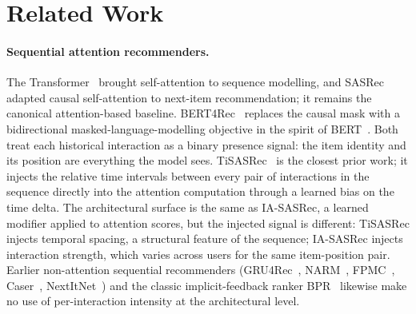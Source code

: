 %
%
\section{Related Work}
\label{sec:related}

\paragraph{Sequential attention recommenders.}
The Transformer~\citep{vaswani2017attention} brought self-attention to
sequence modelling, and SASRec~\citep{kang2018sasrec} adapted causal
self-attention to next-item recommendation; it remains the canonical
attention-based baseline. BERT4Rec~\citep{sun2019bert4rec} replaces the
causal mask with a bidirectional masked-language-modelling objective
in the spirit of BERT~\citep{devlin2019bert}. Both treat each
historical interaction as a binary presence signal: the item identity
and its position are everything the model sees.
TiSASRec~\citep{li2020tisasrec} is the closest prior work; it injects
the relative time intervals between every pair of interactions in the
sequence directly into the attention computation through a learned bias
on the time delta. The architectural surface is the same as IA-SASRec, a learned
modifier applied to attention scores, but the injected signal is
different: TiSASRec injects temporal spacing, a structural feature of
the sequence; IA-SASRec injects interaction strength, which varies
across users for the same item-position pair. Earlier non-attention
sequential recommenders (GRU4Rec~\citep{hidasi2016gru4rec},
NARM~\citep{li2017narm}, FPMC~\citep{rendle2010fpmc},
Caser~\citep{tang2018caser}, NextItNet~\citep{yuan2019nextitnet})
and the classic implicit-feedback ranker BPR~\citep{rendle2009bpr}
likewise make no use of per-interaction intensity at the architectural
level.

